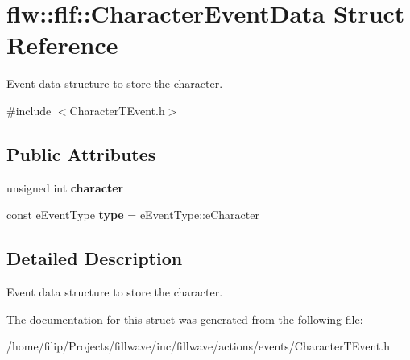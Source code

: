 \hypertarget{structflw_1_1flf_1_1CharacterEventData}{}\section{flw\+:\+:flf\+:\+:Character\+Event\+Data Struct Reference}
\label{structflw_1_1flf_1_1CharacterEventData}


Event data structure to store the character.  




{\ttfamily \#include $<$Character\+T\+Event.\+h$>$}

\subsection*{Public Attributes}
\begin{DoxyCompactItemize}
\item 
unsigned int {\bfseries character}\hypertarget{structflw_1_1flf_1_1CharacterEventData_a66078927332efbd386b6f0a4fb767d38}{}\label{structflw_1_1flf_1_1CharacterEventData_a66078927332efbd386b6f0a4fb767d38}

\item 
const e\+Event\+Type {\bfseries type} = e\+Event\+Type\+::e\+Character\hypertarget{structflw_1_1flf_1_1CharacterEventData_a65d408be95581d3384af0c5bd014c120}{}\label{structflw_1_1flf_1_1CharacterEventData_a65d408be95581d3384af0c5bd014c120}

\end{DoxyCompactItemize}


\subsection{Detailed Description}
Event data structure to store the character. 

The documentation for this struct was generated from the following file\+:\begin{DoxyCompactItemize}
\item 
/home/filip/\+Projects/fillwave/inc/fillwave/actions/events/Character\+T\+Event.\+h\end{DoxyCompactItemize}
